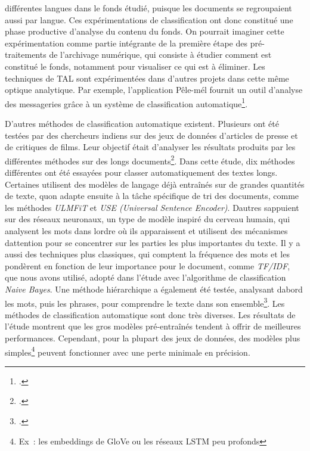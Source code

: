différentes langues dans le fonds étudié, puisque les documents se
regroupaient aussi par langue. Ces expérimentations de classification
ont donc constitué une phase productive d'analyse du contenu du fonds.
On pourrait imaginer cette expérimentation comme partie intégrante de la
première étape des pré-traitements de l'archivage numérique, qui
consiste à étudier comment est constitué le fonds, notamment pour
visualiser ce qui est à éliminer. Les techniques de \gls{TAL} sont expérimentées dans 
d'autres projets dans cette même optique analytique. Par exemple, l'application Pêle-mél 
fournit un outil d'analyse des messageries grâce à un système de classification automatique\footcite{noauthor_bilan_nodate}.\newline

D'autres méthodes de classification automatique existent. Plusieurs ont
été testées par des chercheurs indiens sur des jeux de données
d'articles de presse et de critiques de films. Leur objectif était
d'analyser les résultats produits par les différentes méthodes sur des
longs documents\footcite{wagh_comparative_2021}. Dans
cette étude, dix méthodes différentes ont été essayées pour classer
automatiquement des textes longs. Certaines utilisent des modèles de
langage déjà entraînés sur de grandes quantités de texte,
qu\textquotesingle on adapte ensuite à la tâche spécifique de tri des
documents, comme les méthodes \emph{ULMFiT} et \emph{USE (Universal
	Sentence Encoder)}. D\textquotesingle autres s\textquotesingle appuient
sur des réseaux neuronaux, un type de modèle inspiré du cerveau humain,
qui analysent les mots dans l\textquotesingle ordre où ils apparaissent
et utilisent des mécanismes d\textquotesingle attention pour se
concentrer sur les parties les plus importantes du texte. Il y a aussi
des techniques plus classiques, qui comptent la fréquence des mots et
les pondèrent en fonction de leur importance pour le document, comme
\emph{TF/IDF}, que nous avons utilisé, adopté dans l'étude avec l'algorithme de classification \emph{Naive Bayes}. Une
méthode hiérarchique a également été testée, analysant
d\textquotesingle abord les mots, puis les phrases, pour comprendre le
texte dans son ensemble\footcite{wagh_comparative_2021}. Les méthodes de
classification automatique sont donc très diverses. Les résultats de
l'étude montrent que les gros modèles pré-entraînés tendent à offrir de
meilleures performances. Cependant, pour la plupart des jeux de données,
des modèles plus simples\footnote{Ex~: les embeddings de GloVe ou les
	réseaux LSTM peu profonds} peuvent fonctionner avec une perte minimale
en précision.

